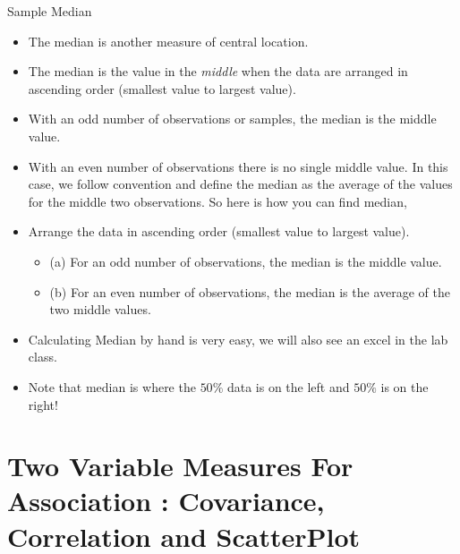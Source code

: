 \documentclass[8pt, usepdftitle=false]{beamer}
\begin{document}
\begin{frame}{Sample Median}


\begin{itemize}

\item The median is another measure of central location. 


\item The median is the value in the \emph{middle} when the data are arranged in \alert{ascending order (smallest value to largest value)}. 


\item With an odd number of observations or samples, the median is the middle value. 


\item With an even number of observations there is no single middle value. In this case, we follow convention and define the median as the average of the values for the middle two observations. So here is how you can find median,


\item Arrange the data in ascending order (smallest value to largest value).
\begin{itemize}

\item (a) For an odd number of observations, the median is the middle value.

\item (b) For an even number of observations, the median is the average of the two middle values.
\end{itemize}

\item Calculating Median by hand is very easy, we will also see an excel in the lab class.

\item Note that median is where the $50\%$ data is on the left and $50\%$ is on the right!



\end{itemize}





\end{frame}


\section{Two Variable Measures For Association : Covariance, Correlation and ScatterPlot}
\end{document}
